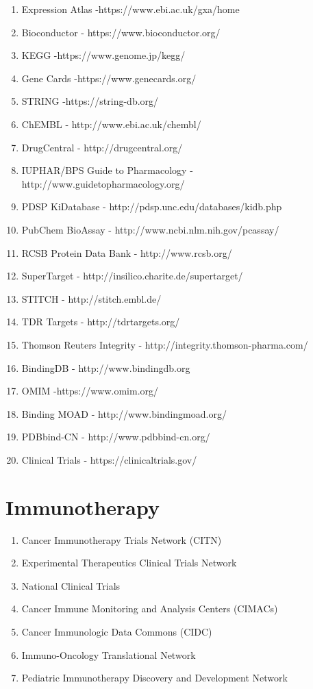 \begin{enumerate}
	\item Expression Atlas -https://www.ebi.ac.uk/gxa/home
	\item Bioconductor - https://www.bioconductor.org/
	\item KEGG -https://www.genome.jp/kegg/
	\item Gene Cards -https://www.genecards.org/
	\item STRING -https://string-db.org/
	\item ChEMBL - http://www.ebi.ac.uk/chembl/ 
	\item DrugCentral - http://drugcentral.org/ 
	\item IUPHAR/BPS Guide to Pharmacology - http://www.guidetopharmacology.org/ 
	\item PDSP KiDatabase - http://pdsp.unc.edu/databases/kidb.php 
	\item PubChem BioAssay - http://www.ncbi.nlm.nih.gov/pcassay/
	\item RCSB Protein Data Bank - http://www.rcsb.org/ 
	\item SuperTarget - http://insilico.charite.de/supertarget/ 
	\item STITCH - http://stitch.embl.de/ 
	\item TDR Targets - http://tdrtargets.org/ 
	\item Thomson Reuters Integrity - http://integrity.thomson-pharma.com/ 
	\item BindingDB - http://www.bindingdb.org 
	\item OMIM -https://www.omim.org/
	\item Binding MOAD - http://www.bindingmoad.org/ 
	\item PDBbind-CN - http://www.pdbbind-cn.org/ 
	\item Clinical Trials - https://clinicaltrials.gov/
\end{enumerate}

\section{Immunotherapy}

\begin{enumerate}
	\item Cancer Immunotherapy Trials Network (CITN)
	\item Experimental Therapeutics Clinical Trials Network 
	\item National Clinical Trials 
	\item Cancer Immune Monitoring and Analysis Centers (CIMACs)
	\item Cancer Immunologic Data Commons (CIDC)
	\item Immuno-Oncology Translational Network
	\item Pediatric Immunotherapy Discovery and Development Network
\end{enumerate} 
